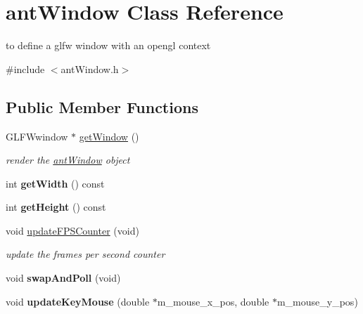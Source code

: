 \hypertarget{classant_window}{\section{ant\+Window Class Reference}
\label{classant_window}
}


to define a glfw window with an opengl context  




{\ttfamily \#include $<$ant\+Window.\+h$>$}

\subsection*{Public Member Functions}
\begin{DoxyCompactItemize}
\item 
G\+L\+F\+Wwindow $\ast$ \hyperlink{classant_window_ae28c1d4b125dd3f63fe341bf1d62e844}{get\+Window} ()
\begin{DoxyCompactList}\small\item\em render the \hyperlink{classant_window}{ant\+Window} object \end{DoxyCompactList}\item 
\hypertarget{classant_window_a42d7686bd139117a7ec1211e9e983684}{int {\bfseries get\+Width} () const }\label{classant_window_a42d7686bd139117a7ec1211e9e983684}

\item 
\hypertarget{classant_window_a8b82e64b718ce3f18ab1745e6dec9e95}{int {\bfseries get\+Height} () const }\label{classant_window_a8b82e64b718ce3f18ab1745e6dec9e95}

\item 
void \hyperlink{classant_window_a8546d18d1de59e9320b186d2162237e9}{update\+F\+P\+S\+Counter} (void)
\begin{DoxyCompactList}\small\item\em update the frames per second counter \end{DoxyCompactList}\item 
\hypertarget{classant_window_aca207a01f3103ea9edf6907ccd7311c9}{void {\bfseries swap\+And\+Poll} (void)}\label{classant_window_aca207a01f3103ea9edf6907ccd7311c9}

\item 
\hypertarget{classant_window_ad94c5ab65a013247cd59fa109e4d8805}{void {\bfseries update\+Key\+Mouse} (double $\ast$m\+\_\+mouse\+\_\+x\+\_\+pos, double $\ast$m\+\_\+mouse\+\_\+y\+\_\+pos)}\label{classant_window_ad94c5ab65a013247cd59fa109e4d8805}


\end{DoxyCompactItemize}
